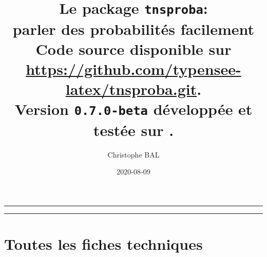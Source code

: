 \documentclass[12pt,a4paper]{article}
\begin{document}
\renewcommand\labelitemi{\raisebox{0.125em}{\tiny\textbullet}}
\renewcommand{\labelitemii}{---}

\title{  %
	Le package \texttt{tnsproba}:\\%
	parler des probabilités facilement\\%
	{\footnotesize Code source disponible sur \url{https://github.com/typensee-latex/tnsproba.git}.}\\%
{\footnotesize Version \texttt{0.7.0-beta} développée et testée sur \macosxname{}.}%
}
\author{Christophe BAL}
\date{2020-08-09}

\maketitle


\vspace{2em}

\hrule

\tableofcontents

\vspace{1.5em}

\hrule

\newpage



\newpage
\section{Toutes les fiches techniques} \label{techincal-ids}

\end{document}
